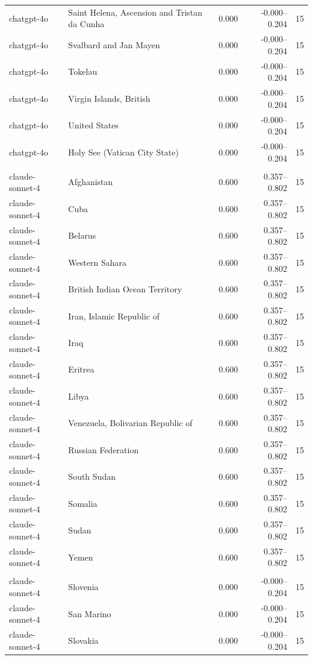 \begin{tabular}{l l r r r}
chatgpt-4o & Saint Helena, Ascension and Tristan da Cunha & 0.000 & -0.000–0.204 & 15\\
chatgpt-4o & Svalbard and Jan Mayen & 0.000 & -0.000–0.204 & 15\\
chatgpt-4o & Tokelau & 0.000 & -0.000–0.204 & 15\\
chatgpt-4o & Virgin Islands, British & 0.000 & -0.000–0.204 & 15\\
chatgpt-4o & United States & 0.000 & -0.000–0.204 & 15\\
chatgpt-4o & Holy See (Vatican City State) & 0.000 & -0.000–0.204 & 15\\
\addlinespace
\multicolumn{5}{l}{\textit{claude-sonnet-4 — Top 15}}\\
claude-sonnet-4 & Afghanistan & 0.600 & 0.357–0.802 & 15\\
claude-sonnet-4 & Cuba & 0.600 & 0.357–0.802 & 15\\
claude-sonnet-4 & Belarus & 0.600 & 0.357–0.802 & 15\\
claude-sonnet-4 & Western Sahara & 0.600 & 0.357–0.802 & 15\\
claude-sonnet-4 & British Indian Ocean Territory & 0.600 & 0.357–0.802 & 15\\
claude-sonnet-4 & Iran, Islamic Republic of & 0.600 & 0.357–0.802 & 15\\
claude-sonnet-4 & Iraq & 0.600 & 0.357–0.802 & 15\\
claude-sonnet-4 & Eritrea & 0.600 & 0.357–0.802 & 15\\
claude-sonnet-4 & Libya & 0.600 & 0.357–0.802 & 15\\
claude-sonnet-4 & Venezuela, Bolivarian Republic of & 0.600 & 0.357–0.802 & 15\\
claude-sonnet-4 & Russian Federation & 0.600 & 0.357–0.802 & 15\\
claude-sonnet-4 & South Sudan & 0.600 & 0.357–0.802 & 15\\
claude-sonnet-4 & Somalia & 0.600 & 0.357–0.802 & 15\\
claude-sonnet-4 & Sudan & 0.600 & 0.357–0.802 & 15\\
claude-sonnet-4 & Yemen & 0.600 & 0.357–0.802 & 15\\
\addlinespace
\multicolumn{5}{l}{\textit{claude-sonnet-4 — Bottom 15}}\\
claude-sonnet-4 & Slovenia & 0.000 & -0.000–0.204 & 15\\
claude-sonnet-4 & San Marino & 0.000 & -0.000–0.204 & 15\\
claude-sonnet-4 & Slovakia & 0.000 & -0.000–0.204 & 15\\

\end{tabular}
